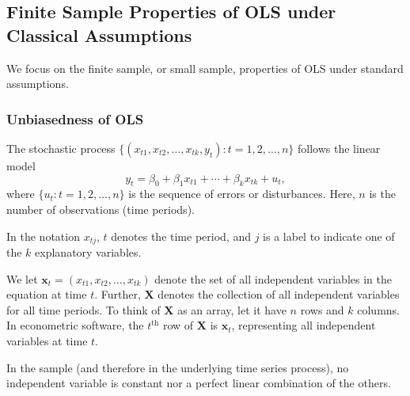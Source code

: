 \documentclass[a4paper, 10pt]{article}
\theoremstyle{definition}	%
\begin{document}
\subsection{Finite Sample Properties of OLS under Classical Assumptions}
We focus on the finite sample, or small sample, properties of OLS under standard assumptions.

\subsubsection{Unbiasedness of OLS}

\begin{tcolorbox}[colback=blue!5!white, colframe=blue!80!black, title=Assumption TS.1 -- Linear in Parameters]
The stochastic process \(\{(x_{t1}, x_{t2}, \ldots, x_{tk}, y_t) : t = 1, 2, \ldots, n\}\) follows the linear model
\begin{equation}
    y_t = \beta_0 + \beta_1 x_{t1} + \cdots + \beta_k x_{tk} + u_t, \label{p.339,10.8}
\end{equation}
where \(\{u_t : t = 1, 2, \ldots, n\}\) is the sequence of errors or disturbances. Here, \(n\) is the number of observations (time periods).
\end{tcolorbox}

In the notation \(x_{tj}\), \(t\) denotes the time period, and \(j\) is a label to indicate one of the \(k\) explanatory variables.

We let \(\mathbf{x}_t = (x_{t1}, x_{t2}, \ldots, x_{tk})\) denote the set of all independent variables in the equation at time \(t\). Further, \(\mathbf{X}\) denotes the collection of all independent variables for all time periods. To think of \(\mathbf{X}\) as an array, let it have \(n\) rows and \(k\) columns. In econometric software, the \(t^{\text{th}}\) row of \(\mathbf{X}\) is \(\mathbf{x}_t\), representing all independent variables at time \(t\).


\begin{tcolorbox}[colback=blue!5!white, colframe=blue!80!black, title=Assumption TS.2 -- No Perfect Collinearity]
In the sample (and therefore in the underlying time series process), no independent variable is constant nor a perfect linear combination of the others.
\end{tcolorbox}
\end{document}
